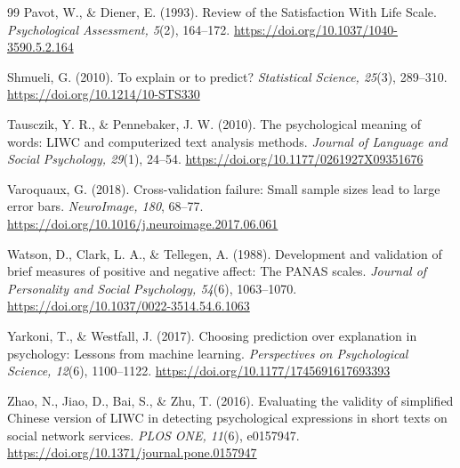 \begin{thebibliography}{99}
Pavot, W., \& Diener, E. (1993). Review of the Satisfaction With Life Scale. \emph{Psychological Assessment, 5}(2), 164--172. \url{https://doi.org/10.1037/1040-3590.5.2.164}

Shmueli, G. (2010). To explain or to predict? \emph{Statistical Science, 25}(3), 289--310. \url{https://doi.org/10.1214/10-STS330}

Tausczik, Y. R., \& Pennebaker, J. W. (2010). The psychological meaning of words: LIWC and computerized text analysis methods. \emph{Journal of Language and Social Psychology, 29}(1), 24--54. \url{https://doi.org/10.1177/0261927X09351676}

Varoquaux, G. (2018). Cross-validation failure: Small sample sizes lead to large error bars. \emph{NeuroImage, 180}, 68--77. \url{https://doi.org/10.1016/j.neuroimage.2017.06.061}

Watson, D., Clark, L. A., \& Tellegen, A. (1988). Development and validation of brief measures of positive and negative affect: The PANAS scales. \emph{Journal of Personality and Social Psychology, 54}(6), 1063--1070. \url{https://doi.org/10.1037/0022-3514.54.6.1063}

Yarkoni, T., \& Westfall, J. (2017). Choosing prediction over explanation in psychology: Lessons from machine learning. \emph{Perspectives on Psychological Science, 12}(6), 1100--1122. \url{https://doi.org/10.1177/1745691617693393}

Zhao, N., Jiao, D., Bai, S., \& Zhu, T. (2016). Evaluating the validity of simplified Chinese version of LIWC in detecting psychological expressions in short texts on social network services. \emph{PLOS ONE, 11}(6), e0157947. \url{https://doi.org/10.1371/journal.pone.0157947}

\end{thebibliography}
